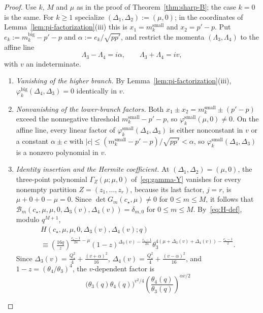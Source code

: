 \documentclass[twoside,10pt]{article}
\numberwithin{equation}{section}
\theoremstyle{slbody}
\theoremstyle{definition}
\theoremstyle{remark}
\begin{document}
\begin{proof}
Use \(k\), \(M\) and \(\mu\) as in the proof of Theorem~\ref{thm:sharp-B}; the
case \(k=0\) is the same.  For \(k\geq1\) specialize
\((\Delta_1,\Delta_2):=(\mu,0)\); in the coordinates of
Lemma~\ref{lem:pi-factorization}(iii) this is \(x_1=m^{\mathrm{small}}_k\) and
\(x_2=p'-p\).  Put \(e_k:=m^{\mathrm{big}}_k-p'-p\) and
\(\alpha:=e_k/\sqrt{pp'}\), and restrict the momenta \((\Lambda_3,\Lambda_4)\) to the affine
line
\[
 \Lambda_3-\Lambda_4=i\alpha,\qquad \Lambda_3+\Lambda_4=iv,
\]
with \(v\) an indeterminate.
\begin{enumerate}\setlength{\itemsep}{2pt}
\item \emph{Vanishing of the higher branch.}  By
  Lemma~\ref{lem:pi-factorization}(iii), \(\varphi^{\mathrm{big}}_k(\Delta_4,\Delta_3)=0\)
  identically in \(v\).
\item \emph{Nonvanishing of the lower-branch factors.}  Both
  \(x_1\pm x_2=m^{\mathrm{small}}_k\pm(p'-p)\) exceed the nonnegative
  threshold \(m^{\mathrm{small}}_k-p'-p\), so
  \(\varphi^{\mathrm{small}}_k(\mu,0)\neq0\).  On the affine line, every linear
  factor of \(\varphi^{\mathrm{small}}_k(\Delta_4,\Delta_3)\) is either nonconstant
  in \(v\) or a constant \(\alpha\pm c\) with
  \(|c|\leq(m^{\mathrm{small}}_k-p'-p)/\sqrt{pp'}<\alpha\), so
  \(\varphi^{\mathrm{small}}_k(\Delta_4,\Delta_3)\) is a nonzero polynomial in \(v\).
\item \emph{Identity insertion and the Hermite coefficient.}
  At \((\Delta_1,\Delta_2)=(\mu,0)\), the three-point polynomial
  \(\Gamma_Z(\mu;\mu,0)\) of~\eqref{eq:gamma-Y} vanishes for every nonempty
  partition \(Z=(z_1,\dots,z_r)\), because its last factor, \(j=r\), is
  \(\mu+0+0-\mu=0\).  Since \(\det G_m(c_\star,\mu)\neq0\) for
  \(0\leq m\leq M\), it follows that
  \(\mathcal B_m(c_\star,\mu,\mu,0,\Delta_3(v),\Delta_4(v))=\delta_{m,0}\)
  for \(0\leq m\leq M\).  By~\eqref{eq:H-def}, modulo \(q^{M+1}\),
  \begin{multline*}
   H(c_\star,\mu,\mu,0,\Delta_3(v),\Delta_4(v);q)\\
   \equiv\left(\frac{16q}{z}\right)^{\frac{c_\star-1}{24}-\mu}
         (1-z)^{\Delta_3(v)-\frac{c_\star-1}{24}}
         \theta_3^{4(\mu+\Delta_3(v)+\Delta_4(v))-\frac{c_\star-1}{2}}.
  \end{multline*}
  Since \(\Delta_3(v)=\frac{Q_\star^2}{4}+\frac{(v+\alpha)^2}{16}\),
  \(\Delta_4(v)=\frac{Q_\star^2}{4}+\frac{(v-\alpha)^2}{16}\), and
  \(1-z=(\theta_4/\theta_3)^4\), the \(v\)-dependent factor is
  \[
   \bigl(\theta_3(q)\theta_4(q)\bigr)^{v^2/4}
   \left(\frac{\theta_4(q)}{\theta_3(q)}\right)^{\alpha v/2}
\]
\end{enumerate}
\end{proof}
\end{document}
